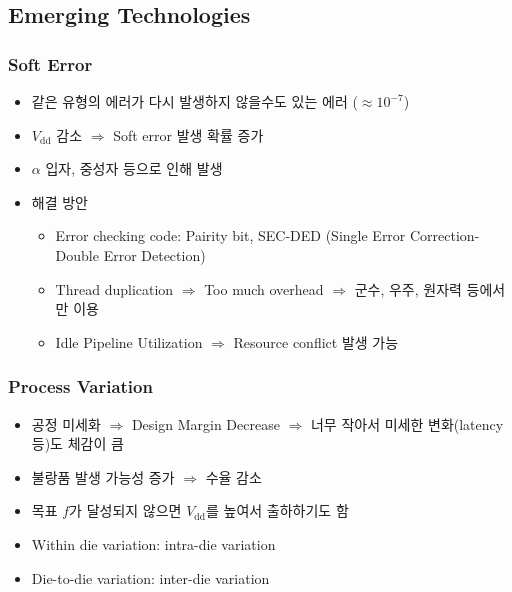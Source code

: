 \subsection{Emerging Technologies}

\subsubsection*{Soft Error}
\begin{itemize}
    \item 같은 유형의 에러가 다시 발생하지 않을수도 있는 에러 ($\approx 10^{-7}$)
    \item $V_{\mathrm{dd}}$ 감소 $\Rightarrow$ Soft error 발생 확률 증가
    \item $\alpha$ 입자, 중성자 등으로 인해 발생
    \item 해결 방안
    \begin{itemize}
        \item Error checking code: Pairity bit, SEC-DED (Single Error Correction-Double Error Detection)
        \item Thread duplication $\Rightarrow$ Too much overhead $\Rightarrow$ 군수, 우주, 원자력 등에서만 이용
        \item Idle Pipeline Utilization $\Rightarrow$ Resource conflict 발생 가능
    \end{itemize}
\end{itemize}

\subsubsection*{Process Variation}
\begin{itemize}
    \item 공정 미세화 $\Rightarrow$ Design Margin Decrease $\Rightarrow$ 너무 작아서 미세한 변화(latency 등)도 체감이 큼
    \item 불랑품 발생 가능성 증가 $\Rightarrow$ 수율 감소
    \item 목표 $f$가 달성되지 않으면 $V_{\mathrm{dd}}$를 높여서 출하하기도 함
    \item Within die variation: intra-die variation
    \item Die-to-die variation: inter-die variation
\end{itemize}
